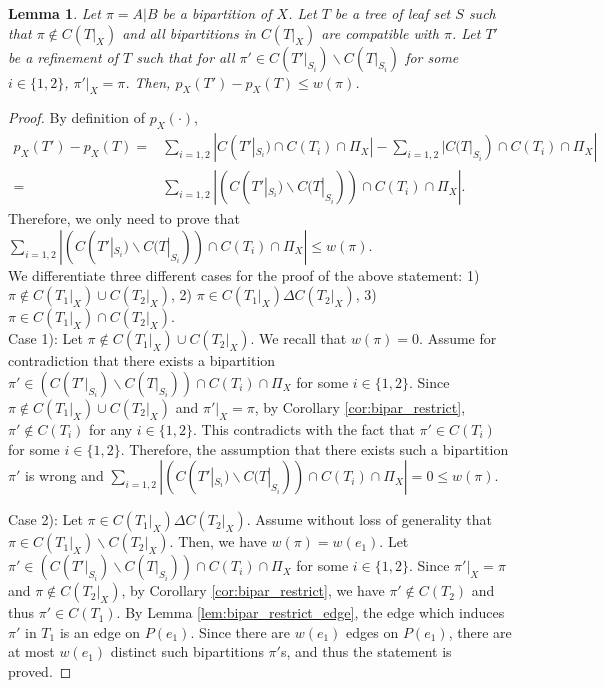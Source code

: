 \documentclass{bmcart}
\newtheorem{lemma}{Lemma}
\begin{document}
\begin{lemma} \label{lem:one_bipar_upperbound}
    Let $\pi = A|B$ be a bipartition of $X$. Let $T$ be a tree of leaf set $S$ such that $\pi \notin C(T|_X)$ and all bipartitions in $C(T|_X)$ are compatible with $\pi$. Let $T'$ be a refinement of $T$ such that for all $\pi' \in C(T'|_{S_i}) \backslash C(T|_{S_i})$ for some $i \in \{1,2\}$, $\pi'|_X = \pi$. Then, $p_X(T') - p_X(T) \le w(\pi)$. 
\end{lemma}
\begin{proof}
    By definition of $p_X(\cdot)$, 
    \begin{align*}
         p_X(T') - p_X(T) 
        =& \sum_{i = 1,2} |C(T'|_{S_i}) \cap C(T_i) \cap \Pi_X| - \sum_{i = 1,2} |C(T|_{S_i}) \cap C(T_i) \cap \Pi_X| \\
        =& \sum_{i = 1,2}|(C(T'|_{S_i})\backslash C(T|_{S_i})) \cap C(T_i) \cap \Pi_X|.
    \end{align*}
    Therefore, we only need to prove that $\sum_{i = 1,2}|(C(T'|_{S_i})\backslash C(T|_{S_i})) \cap C(T_i) \cap \Pi_X| \le w(\pi)$. \\
    
    We differentiate three different cases for the proof of the above statement: 1) $\pi \notin C(T_1|_X)\cup C(T_2|_X)$, 2) $\pi \in C(T_1|_X) \Delta C(T_2|_X)$, 3) $\pi \in C(T_1|_X) \cap C(T_2|_X)$. \\
    
    Case 1): Let $\pi \notin C(T_1|_X)\cup C(T_2|_X)$. We recall that $w(\pi) = 0$. Assume for contradiction that there exists a bipartition $\pi'\in (C(T'|_{S_i})\backslash C(T|_{S_i})) \cap C(T_i) \cap \Pi_X$ for some $i \in \{1,2\}$.  Since $\pi \notin C(T_1|_X)\cup C(T_2|_X)$ and $\pi'|_X = \pi$, by Corollary \ref{cor:bipar_restrict}, $\pi' \notin C(T_i)$ for any $i \in \{1,2\}$. This contradicts with the fact that $\pi' \in C(T_i)$ for some $i \in \{1,2\}$. Therefore, the assumption that there exists such a bipartition $\pi'$ is wrong and $\sum_{i = 1,2}|(C(T'|_{S_i})\backslash C(T|_{S_i})) \cap C(T_i) \cap \Pi_X| = 0 \le w(\pi)$.\smallskip
    
    Case 2): Let $\pi \in C(T_1|_X) \Delta C(T_2|_X)$. Assume without loss of generality that $\pi \in C(T_1|_X) \backslash C(T_2|_X)$. Then, we have $w(\pi) = w(e_1)$. Let $\pi'\in (C(T'|_{S_i})\backslash C(T|_{S_i})) \cap C(T_i) \cap \Pi_X$ for some $i \in \{1,2\}$. Since $\pi'|_X = \pi$ and $\pi \notin C(T_2|_X)$, by Corollary \ref{cor:bipar_restrict}, we have $\pi' \notin C(T_2)$ and thus $\pi' \in C(T_1)$. By Lemma \ref{lem:bipar_restrict_edge}, the edge which induces $\pi'$ in $T_1$ is an edge on $P(e_1)$. Since there are $w(e_1)$ edges on $P(e_1)$, there are at most $w(e_1)$ distinct such bipartitions $\pi'$s, and thus the statement is proved.\smallskip
    

\end{proof}
\end{document}
